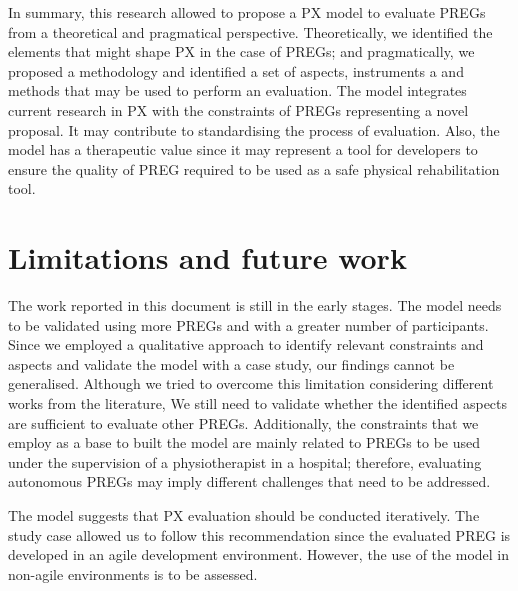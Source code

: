 In summary, this research allowed to propose a \ac{PX} model to evaluate \acp{PREG} from a theoretical and pragmatical perspective. Theoretically, we identified the elements that might shape \ac{PX} in the case of \acp{PREG}; and pragmatically, we proposed a methodology and identified a set of aspects, instruments a and methods that may be used to perform an evaluation. The model integrates current research in \ac{PX} with the constraints of \acp{PREG} representing a novel proposal. It may contribute to standardising the process of evaluation. Also, the model has a therapeutic value since it may represent a tool for developers to ensure the quality of \ac{PREG} required to be used as a safe physical rehabilitation tool.

\section{Limitations and future work}
The work reported in this document is still in the early stages. The model needs to be validated using more \acp{PREG} and with a greater number of participants. Since we employed a qualitative approach to identify relevant constraints and aspects and validate the model with a case study, our findings cannot be generalised. Although we tried to overcome this limitation considering different works from the literature, We still need to validate whether the identified aspects are sufficient to evaluate other \acp{PREG}. Additionally, the constraints that we employ as a base to built the model are mainly related to \acp{PREG} to be used under the supervision of a physiotherapist in a hospital; therefore, evaluating autonomous \acp{PREG} may imply different challenges that need to be addressed.

The model suggests that \ac{PX} evaluation should be conducted iteratively. The study case allowed us to follow this recommendation since the evaluated \ac{PREG} is developed in an agile development environment. However, the use of the model in non-agile environments is to be assessed.